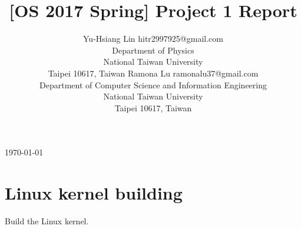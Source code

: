 \documentclass[twoside, 11pt, tablecaption=bottom]{article}
\begin{document}
\today

\title{[OS 2017 Spring] Project 1 Report}

\author{%
	\name Yu-Hsiang Lin \email hitr2997925@gmail.com \\
	\addr Department of Physics\\
	National Taiwan University\\
	Taipei 10617, Taiwan
	\AND
	\name Ramona Lu \email ramonalu37@gmail.com \\
	\addr Department of Computer Science and Information Engineering\\
	National Taiwan University\\
	Taipei 10617, Taiwan
}


\maketitle










\section{Linux kernel building}

	Build the Linux kernel.




\vskip 0.2in
%
\end{document}
